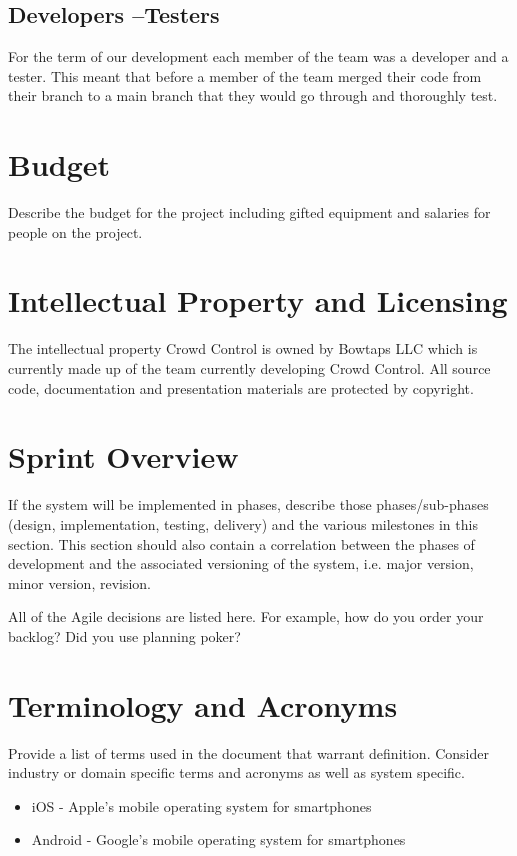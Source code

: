 \subsection{Developers --Testers}
For the term of our development each member of the team was a developer and a tester.  This meant that before a member of the team merged their code from their branch to a main branch that they would go through and thoroughly test.

\section{Budget}
Describe the budget for the project including gifted equipment and salaries for 
people on the project.

\section{Intellectual Property and Licensing}
The intellectual property Crowd Control is owned by Bowtaps LLC which is currently made up of the team currently developing Crowd Control.  All source code, documentation and presentation materials are protected by copyright.

\section{Sprint  Overview}
If the system will be implemented in phases, describe those phases/sub-phases (design, 
implementation, testing, delivery) and the various milestones in this section. 
 This section should also contain a correlation between the phases of development 
and the associated versioning of the system, i.e. major version, minor version, 
revision. 

All of the Agile decisions are listed here.  For example, how do you order your backlog?   
Did you use planning poker?   

\section{Terminology and Acronyms}
Provide a list of terms used in the document that warrant definition.  Consider 
industry or domain specific terms and acronyms as well as system specific. 
\begin{itemize}
\item iOS - Apple's mobile operating system for smartphones
\item Android - Google's mobile operating system for smartphones
\end{itemize}

